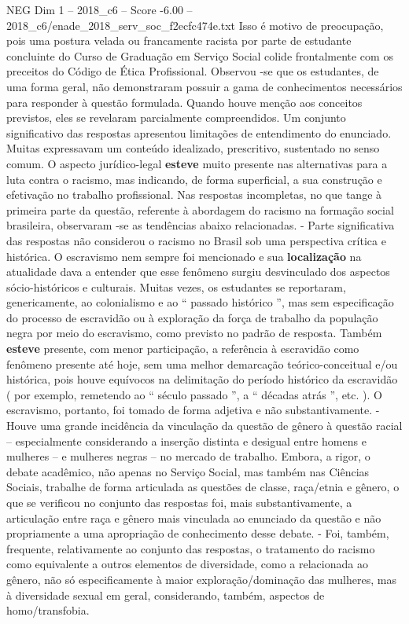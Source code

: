\begin{textsample}{NEG Dim 1 – 2018\_c6 – Score -6.00 – 2018\_c6/enade\_2018\_serv\_soc\_f2ecfc474e.txt}
Isso é motivo de preocupação, pois uma postura velada ou francamente racista por parte de estudante concluinte do Curso de Graduação em Serviço Social colide frontalmente com os preceitos do Código de Ética Profissional.
Observou -se que os estudantes, de uma forma geral, não demonstraram possuir a gama de conhecimentos necessários para responder à questão formulada.
Quando houve menção aos conceitos previstos, eles se revelaram parcialmente compreendidos.
Um conjunto significativo das respostas apresentou limitações de entendimento do enunciado.
Muitas expressavam um conteúdo idealizado, prescritivo, sustentado no senso comum.
O aspecto jurídico-legal \textbf{esteve} muito presente nas alternativas para a luta contra o racismo, mas indicando, de forma superficial, a sua construção e efetivação no trabalho profissional.
Nas respostas incompletas, no que tange à primeira parte da questão, referente à abordagem do racismo na formação social brasileira, observaram -se as tendências abaixo relacionadas. - Parte significativa das respostas não considerou o racismo no Brasil sob uma perspectiva crítica e histórica.
O escravismo nem sempre foi mencionado e sua \textbf{localização} na atualidade dava a entender que esse fenômeno surgiu desvinculado dos aspectos sócio-históricos e culturais.
Muitas vezes, os estudantes se reportaram, genericamente, ao colonialismo e ao “ passado histórico ”, mas sem especificação do processo de escravidão ou à exploração da força de trabalho da população negra por meio do escravismo, como previsto no padrão de resposta.
Também \textbf{esteve} presente, com menor participação, a referência à escravidão como fenômeno presente até hoje, sem uma melhor demarcação teórico-conceitual e/ou histórica, pois houve equívocos na delimitação do período histórico da escravidão ( por exemplo, remetendo ao “ século passado ”, a “ décadas atrás ”, etc. ).
O escravismo, portanto, foi tomado de forma adjetiva e não substantivamente. - Houve uma grande incidência da vinculação da questão de gênero à questão racial – especialmente considerando a inserção distinta e desigual entre homens e mulheres – e mulheres negras – no mercado de trabalho.
Embora, a rigor, o debate acadêmico, não apenas no Serviço Social, mas também nas Ciências Sociais, trabalhe de forma articulada as questões de classe, raça/etnia e gênero, o que se verificou no conjunto das respostas foi, mais substantivamente, a articulação entre raça e gênero mais vinculada ao enunciado da questão e não propriamente a uma apropriação de conhecimento desse debate. - Foi, também, frequente, relativamente ao conjunto das respostas, o tratamento do racismo como equivalente a outros elementos de diversidade, como a relacionada ao gênero, não só especificamente à maior exploração/dominação das mulheres, mas à diversidade sexual em geral, considerando, também, aspectos de homo/transfobia.

\end{textsample}
